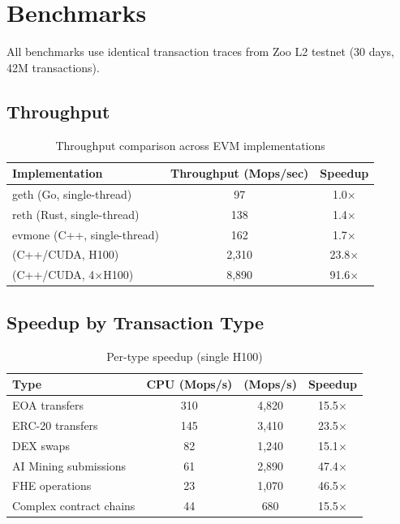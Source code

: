 \section{Benchmarks}

\label{sec:benchmarks}

All benchmarks use identical transaction traces from Zoo L2 testnet (30 days, 42M transactions).

\subsection{Throughput}

\begin{table}[h]
\centering
\begin{tabular}{lcc}
\toprule
\textbf{Implementation} & \textbf{Throughput (Mops/sec)} & \textbf{Speedup} \\
\midrule
geth (Go, single-thread) & 97 & 1.0$\times$ \\
reth (Rust, single-thread) & 138 & 1.4$\times$ \\
evmone (C++, single-thread) & 162 & 1.7$\times$ \\
\cevm{} (C++/CUDA, H100) & 2,310 & 23.8$\times$ \\
\cevm{} (C++/CUDA, 4$\times$H100) & 8,890 & 91.6$\times$ \\
\bottomrule
\end{tabular}
\caption{Throughput comparison across EVM implementations}
\label{tab:throughput}
\end{table}

\subsection{Speedup by Transaction Type}

\begin{table}[h]
\centering
\begin{tabular}{lccc}
\toprule
\textbf{Type} & \textbf{CPU (Mops/s)} & \textbf{\cevm{} (Mops/s)} & \textbf{Speedup} \\
\midrule
EOA transfers & 310 & 4,820 & 15.5$\times$ \\
ERC-20 transfers & 145 & 3,410 & 23.5$\times$ \\
DEX swaps & 82 & 1,240 & 15.1$\times$ \\
AI Mining submissions & 61 & 2,890 & 47.4$\times$ \\
FHE operations & 23 & 1,070 & 46.5$\times$ \\
Complex contract chains & 44 & 680 & 15.5$\times$ \\
\bottomrule
\end{tabular}
\caption{Per-type speedup (single H100)}
\label{tab:type-speedup}
\end{table}

